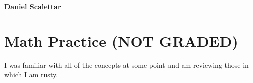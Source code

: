 \documentclass[fleqn]{article}
\begin{document}

\begin{center}
	\textbf{Daniel Scalettar}
\end{center}

\section{ Math Practice (NOT GRADED)}

I was familiar with all of the concepts at some point and am reviewing those in which I am rusty.
\end{document}
